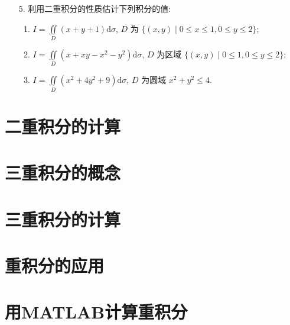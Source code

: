 \begin{enumerate}
    \item[5.] 利用二重积分的性质估计下列积分的值:
    \begin{enumerate}[(1)]\setlength{\itemsep}{5pt}\setlength{\topsep}{15pt}
        \item $\displaystyle I=\iint\limits_{D}(x+y+1)\text{d}\sigma$, $D$ 为 $\{(x, y)\mid 0\leqslant x\leqslant 1,0\leqslant y\leqslant 2\}$;
        \item $\displaystyle I=\iint\limits_{D}(x+xy-x^2-y^2)\text{d}\sigma$, $D$ 为区域 $\{(x, y) \mid 0\leqslant 1, 0\leqslant y \leqslant 2\}$;
        \item $\displaystyle I=\iint\limits_{D}(x^2+4y^2+9)\text{d}\sigma$, $D$ 为圆域 $x^2+y^2\leqslant 4$.
    \end{enumerate} 
\end{enumerate}

\section{二重积分的计算}



\section{三重积分的概念}



\section{三重积分的计算}



\section{重积分的应用}



\section{用MATLAB计算重积分}

